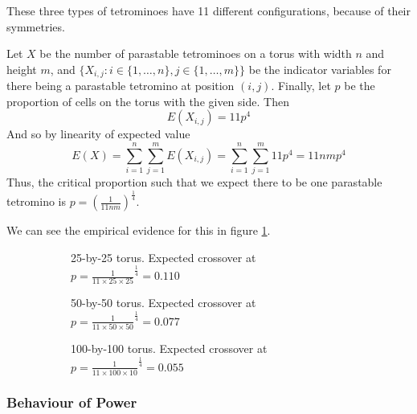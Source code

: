 \documentclass[12pt]{article}
\theoremstyle{definition}
\theoremstyle{remark}
\theoremstyle{remark}
\begin{document}
\par
These three types of tetrominoes have 11 different configurations, because of their symmetries.
\par
Let $X$ be the number of parastable tetrominoes on a torus with
width $n$ and height $m$, and $\{X_{i,j}:i\in\{1,\ldots,n\},j\in\{1,\ldots,m\}\}$
be the indicator variables for there being a parastable tetromino at
position $\left(i,j\right)$. Finally, let $p$ be the proportion of cells
on the torus with the given side. Then
\begin{equation}
	E(X_{i,j})=11p^4
	\end{equation}
And so by linearity of expected value
\begin{equation}
	E(X)=\sum_{i=1}^n \sum_{j=1}^m E(X_{i,j})=\sum_{i=1}^n \sum_{j=1}^m 11p^4 = 11nmp^4
\end{equation}
Thus, the critical proportion such that we expect there to be one
parastable tetromino is $p=\left(\frac{1}{11nm}\right)^{\frac{1}{4}}$.
\par
We can see the empirical evidence for this in figure \ref{HomoDiagrams}.

\begin{figure}
  \centering
  \begin{subfigure}[b]{0.6\linewidth}
    \caption{25-by-25 torus. Expected crossover at ${p=\frac{1}{11\times25\times25}}^{\frac{1}{4}}=0.110$}
  \end{subfigure}
  \begin{subfigure}[b]{0.6\linewidth}
    \caption{50-by-50 torus. Expected crossover at ${p=\frac{1}{11\times50\times50}}^{\frac{1}{4}}=0.077$}
  \end{subfigure}
  \begin{subfigure}[b]{0.6\linewidth}
    \caption{100-by-100 torus. Expected crossover at ${p=\frac{1}{11\times100\times10}}^{\frac{1}{4}}=0.055$}
  \end{subfigure}
  \caption{}
  \label{HomoDiagrams}
\end{figure}

\subsubsection{Behaviour of Power} \label{Power}
\end{document}
